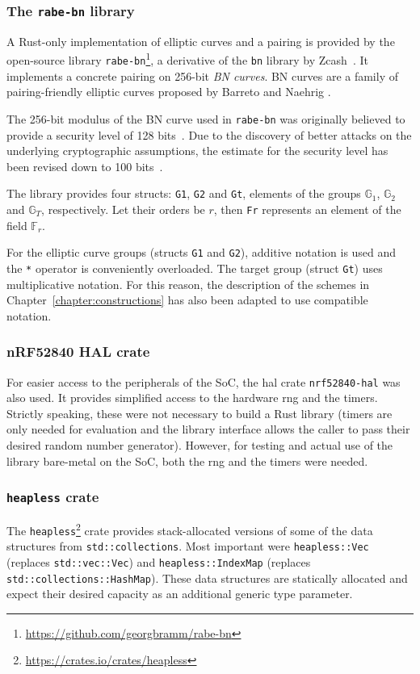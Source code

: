 \subsubsection{The \texttt{rabe-bn} library}

A Rust-only implementation of elliptic curves and a pairing is provided by the open-source library \texttt{rabe-bn}\footnote{\url{https://github.com/georgbramm/rabe-bn}}, a derivative of the \texttt{bn} library by Zcash~\cite{bowe_bn_2016}.
It implements a concrete pairing on 256-bit \emph{BN curves}. %
BN curves are a family of pairing-friendly elliptic curves proposed by Barreto and Naehrig \cite{barreto_pairing-friendly_2006}.

The 256-bit modulus of the BN curve used in \texttt{rabe-bn} was originally believed to provide a security level of 128 bits~\cite{ben-sasson_succinct_2013}. 
Due to the discovery of better attacks on the underlying cryptographic assumptions, the estimate for the security level has been revised down to 100 bits~\cite{yonezawa_pairing-friendly_2019}.

The library provides four structs: \texttt{G1}, \texttt{G2} and \texttt{Gt}, elements of the groups $\mathbb{G}_1$, $\mathbb{G}_2$ and $\mathbb{G}_T$, respectively.
Let their orders be $r$, then \texttt{Fr} represents an element of the field $\mathbb{F}_r$.

For the elliptic curve groups (structs \texttt{G1} and \texttt{G2}), additive notation is used and the \texttt{*} operator is conveniently overloaded.
The target group (struct \texttt{Gt}) uses multiplicative notation.
For this reason, the description of the schemes in Chapter~\ref{chapter:constructions} has also been adapted to use compatible notation.

\subsubsection{nRF52840 HAL crate}
For easier access to the peripherals of the SoC, the \acrfull{hal} \gls{crate} \texttt{nrf52840-hal} was also used.
It provides simplified access to the hardware \acrfull{rng} and the timers.
Strictly speaking, these were not necessary to build a Rust library (timers are only needed for evaluation and the library interface allows the caller to pass their desired random number generator).
However, for testing and actual use of the library bare-metal on the SoC, both the \acrshort{rng} and the timers were needed.

\subsubsection{\texttt{heapless} crate}
The \texttt{heapless}\footnote{\url{https://crates.io/crates/heapless}} crate provides stack-allocated versions of some of the data structures from \texttt{std::collections}. 
Most important were \texttt{heapless::Vec} (replaces \texttt{std::vec::Vec}) and \texttt{heapless::IndexMap} (replaces \texttt{std::collections::HashMap}).
These data structures are statically allocated and expect their desired capacity as an additional generic type parameter.

